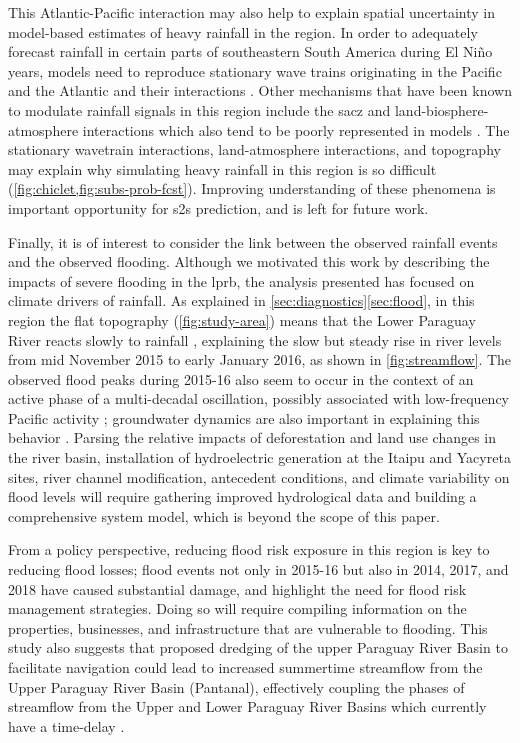 \documentclass{ametsoc}
\begin{document}
This Atlantic-Pacific interaction may also help to explain spatial uncertainty in model-based estimates of heavy rainfall in the region.
In order to adequately forecast rainfall in certain parts of southeastern South America during El Ni\~no years, models need to reproduce stationary wave trains originating in the Pacific and the Atlantic and their interactions \citep{Barreiro2017}.
Other mechanisms that have been known to modulate rainfall signals in this region include the \gls{sacz} \citep{Carvalho2004,Munoz2015,Munoz2016} and land-biosphere-atmosphere interactions \citep{Grimm2000,Grimm2007} which also tend to be poorly represented in models \citep{Koster2004,Green2017}.
The stationary wavetrain interactions, land-atmosphere interactions, and topography may explain why simulating heavy rainfall in this region is so difficult (\cref{fig:chiclet,fig:subs-prob-fcst}).
Improving understanding of these phenomena is important opportunity for \gls{s2s} prediction, and is left for future work.

Finally, it is of interest to consider the link between the observed rainfall events and the observed flooding.
Although we motivated this work by describing the impacts of severe flooding in the \gls{lprb}, the analysis presented has focused on climate drivers of rainfall.
As explained in \cref{sec:diagnostics}\ref{sec:flood}, in this region the flat topography (\cref{fig:study-area}) means that the Lower Paraguay River reacts slowly to rainfall \citep{Bravo2011,Barros2004}, explaining the slow but steady rise in river levels from mid November 2015 to early January 2016, as shown in \cref{fig:streamflow}.
The observed flood peaks during 2015-16 also seem to occur in the context of an active phase of a multi-decadal oscillation, possibly associated with low-frequency Pacific activity \citep{Collischonn2001,Huang2005}; groundwater dynamics are also important in explaining this behavior \citep{Santos2016}.
Parsing the relative impacts of deforestation and land use changes in the river basin, installation of hydroelectric generation at the Itaipu and Yacyreta sites, river channel modification, antecedent conditions, and climate variability on flood levels will require gathering improved hydrological data and building a comprehensive system model, which is beyond the scope of this paper.

From a policy perspective, reducing flood risk exposure in this region is key to reducing flood losses; flood events not only in 2015-16 but also in 2014, 2017, and 2018 have caused substantial damage, and highlight the need for flood risk management strategies.
Doing so will require compiling information on the properties, businesses, and infrastructure that are vulnerable to flooding.
This study also suggests that proposed dredging of the upper Paraguay River Basin to facilitate navigation could lead to increased summertime streamflow from the Upper Paraguay River Basin (Pantanal), effectively coupling the phases of streamflow from the Upper and Lower Paraguay River Basins which currently have a time-delay \citep{Bravo2011}.
\end{document}

